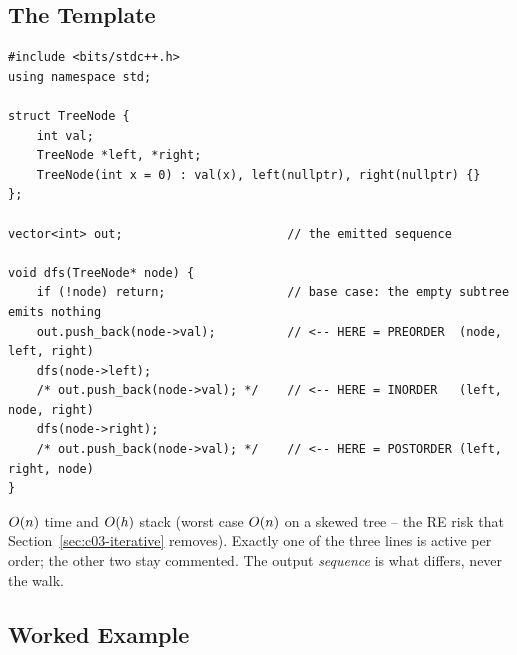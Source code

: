 \subsection{The Template}

\begin{lstlisting}[caption={One walk, three orders -- move the \code{out.push\_back} line}, label={lst:c03-dfs}]
#include <bits/stdc++.h>
using namespace std;

struct TreeNode {
    int val;
    TreeNode *left, *right;
    TreeNode(int x = 0) : val(x), left(nullptr), right(nullptr) {}
};

vector<int> out;                       // the emitted sequence

void dfs(TreeNode* node) {
    if (!node) return;                 // base case: the empty subtree emits nothing
    out.push_back(node->val);          // <-- HERE = PREORDER  (node, left, right)
    dfs(node->left);
    /* out.push_back(node->val); */    // <-- HERE = INORDER   (left, node, right)
    dfs(node->right);
    /* out.push_back(node->val); */    // <-- HERE = POSTORDER (left, right, node)
}
\end{lstlisting}
\begin{complexitybox}
$O(n)$ time and $O(h)$ stack (worst case $O(n)$ on a skewed tree -- the
\textsf{RE} risk that Section~\ref{sec:c03-iterative} removes). Exactly one of the three
 lines is active per order; the other two stay commented. The output
\emph{sequence} is what differs, never the walk.
\end{complexitybox}

\subsection{Worked Example}

